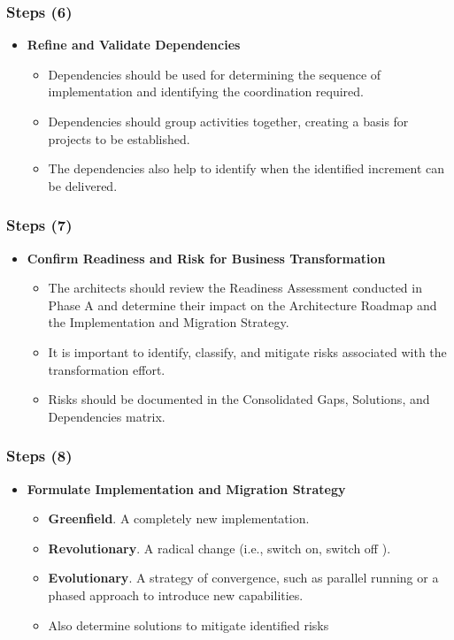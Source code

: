 \documentclass[aspectratio=169, table]{beamer}
\begin{document}
	\begin{frame}
		\frametitle{Steps (6)}
		\vspace{20pt}
		\begin{itemize}
			\item \textbf{Refine and Validate Dependencies}
			\begin{itemize}
				\item Dependencies should be used for determining
				the sequence of implementation and identifying the coordination required.
				\item  Dependencies should group activities together, creating a basis
				for projects to be established.
				\item  The dependencies also help to identify when the identified increment can be delivered.
			\end{itemize}
		\end{itemize}
	\end{frame}

	\begin{frame}
		\frametitle{Steps (7)}
		\vspace{20pt}
		\begin{itemize}
			\item \textbf{Confirm Readiness and Risk for Business Transformation}
			\begin{itemize}
				\item The architects should review the Readiness Assessment conducted in Phase A and determine their
				impact on the Architecture Roadmap and the Implementation and Migration
				Strategy. 
				\item It is important to identify, classify, and mitigate risks associated with
				the transformation effort. 
				\item Risks should be documented in the Consolidated
				Gaps, Solutions, and Dependencies matrix.
			\end{itemize}
		\end{itemize}
	\end{frame}

	\begin{frame}
		\frametitle{Steps (8)}
		\vspace{20pt}
		\begin{itemize}
			\item \textbf{Formulate Implementation and Migration Strategy}
			\begin{itemize}
				\item \textbf{Greenfield}. A completely new implementation.
				\item \textbf{Revolutionary}. A radical change (i.e., switch on, switch off ).
				\item \textbf{Evolutionary}. A strategy of convergence, such as parallel running or a
				phased approach to introduce new capabilities.
				\item Also determine solutions to mitigate identified risks
			\end{itemize}
		\end{itemize}
	\end{frame}
\end{document}
